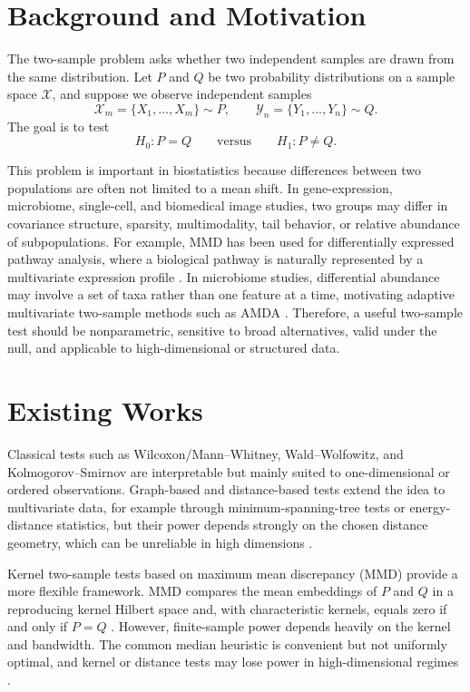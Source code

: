 \documentclass[12pt]{article}
\begin{document}
\section{Background and Motivation}

The two-sample problem asks whether two independent samples are drawn from the same distribution. Let \(P\) and \(Q\) be two probability distributions on a sample space \(\mathcal{X}\), and suppose we observe independent samples
\[
\mathcal{X}_m=\{X_1,\ldots,X_m\}\sim P,\qquad
\mathcal{Y}_n=\{Y_1,\ldots,Y_n\}\sim Q.
\]
The goal is to test
\[
H_0:P=Q
\qquad\text{versus}\qquad
H_1:P\ne Q.
\]

This problem is important in biostatistics because differences between two populations are often not limited to a mean shift. In gene-expression, microbiome, single-cell, and biomedical image studies, two groups may differ in covariance structure, sparsity, multimodality, tail behavior, or relative abundance of subpopulations. For example, MMD has been used for differentially expressed pathway analysis, where a biological pathway is naturally represented by a multivariate expression profile \cite{gretton2012mmd,shang2016pathway}. In microbiome studies, differential abundance may involve a set of taxa rather than one feature at a time, motivating adaptive multivariate two-sample methods such as AMDA \cite{banerjee2019amda}. Therefore, a useful two-sample test should be nonparametric, sensitive to broad alternatives, valid under the null, and applicable to high-dimensional or structured data.

\section{Existing Works}

Classical tests such as Wilcoxon/Mann--Whitney, Wald--Wolfowitz, and Kolmogorov--Smirnov are interpretable but mainly suited to one-dimensional or ordered observations. Graph-based and distance-based tests extend the idea to multivariate data, for example through minimum-spanning-tree tests or energy-distance statistics, but their power depends strongly on the chosen distance geometry, which can be unreliable in high dimensions \cite{friedman1979mst,sejdinovic2013equivalence}.

Kernel two-sample tests based on maximum mean discrepancy (MMD) provide a more flexible framework. MMD compares the mean embeddings of \(P\) and \(Q\) in a reproducing kernel Hilbert space and, with characteristic kernels, equals zero if and only if \(P=Q\) \cite{gretton2012mmd}. However, finite-sample power depends heavily on the kernel and bandwidth. The common median heuristic is convenient but not uniformly optimal, and kernel or distance tests may lose power in high-dimensional regimes \cite{ramdas2015decreasing}.
\end{document}
